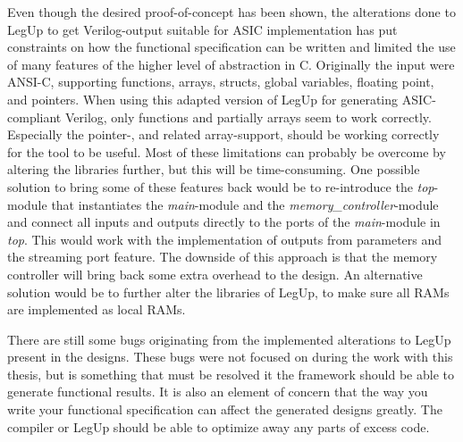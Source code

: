 Even though the desired proof-of-concept has been shown, the alterations done to LegUp to get Verilog-output suitable for ASIC implementation has put constraints on how the functional specification can be written and limited the use of many features of the higher level of abstraction in C. Originally the input were ANSI-C, supporting functions, arrays, structs, global variables, floating point, and pointers. When using this adapted version of LegUp for generating ASIC-compliant Verilog, only functions and partially arrays seem to work correctly. Especially the pointer-, and related array-support, should be working correctly for the tool to be useful. Most of these limitations can probably be overcome by altering the libraries further, but this will be time-consuming. One possible solution to bring some of these features back would be to re-introduce the \textit{top}-module that instantiates the \textit{main}-module and the \textit{memory\_controller}-module and connect all inputs and outputs directly to the ports of the \textit{main}-module in \textit{top}. This would work with the implementation of outputs from parameters and the streaming port feature. The downside of this approach is that the memory controller will bring back some extra overhead to the design. An alternative solution would be to further alter the libraries of LegUp, to make sure all RAMs are implemented as local RAMs. 

There are still some bugs originating from the implemented alterations to LegUp present in the designs. These bugs were not focused on during the work with this thesis, but is something that must be resolved it the framework should be able to generate functional results. It is also an element of concern that the way you write your functional specification can affect the generated designs greatly. The compiler or LegUp should be able to optimize away any parts of excess code.
